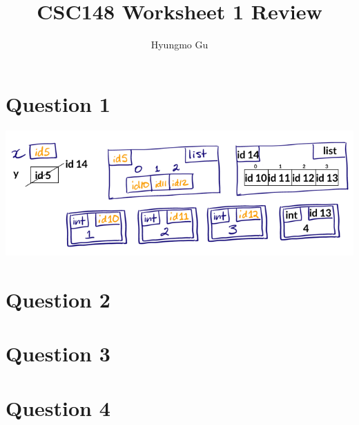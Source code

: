 \documentclass[12pt]{article}
\begin{document}
\title{CSC148 Worksheet 1 Review}
\author{Hyungmo Gu}
\maketitle

\section*{Question 1}
\begin{center}
\includegraphics[width=0.8\linewidth]{images/worksheet_1_review_q1_solution.png}
\end{center}


\section*{Question 2}

\section*{Question 3}

\section*{Question 4}
\end{document}

